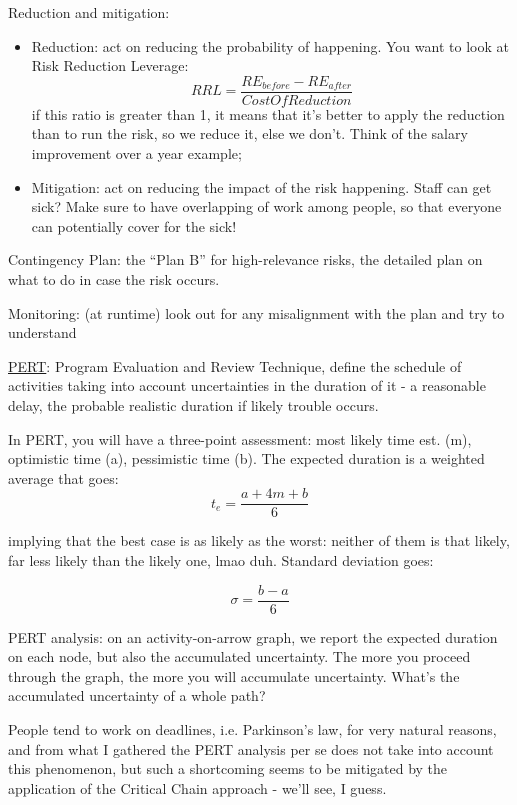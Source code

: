 \noindent Reduction and mitigation:
\begin{itemize}
    \item Reduction: act on reducing the probability of happening. You want to look at Risk Reduction Leverage: \[RRL = \dfrac{RE_{before}-RE_{after}}{CostOfReduction}\]
    if this ratio is greater than 1, it means that it's better to apply the reduction than to run the risk, so we reduce it, else we don't. Think of the salary improvement over a year example;
    \item Mitigation: act on reducing the impact of the risk happening. Staff can get sick? Make sure to have overlapping of work among people, so that everyone can potentially cover for the sick! 
\end{itemize}

\noindent Contingency Plan: the ``Plan B'' for high-relevance risks, the detailed plan on what to do in case the risk occurs.

\noindent Monitoring: (at runtime) look out for any misalignment with the plan and try to understand

\noindent \underline{PERT}: Program Evaluation and Review Technique, define the schedule of activities taking into account uncertainties in the duration of it - a reasonable delay, the probable realistic duration if likely trouble occurs.

\noindent In PERT, you will have a three-point assessment: most likely time est. (m), optimistic time (a), pessimistic time (b). The expected duration is a weighted average that goes:
\[t_e = \dfrac{a+4m+b}{6}\]

\noindent implying that the best case is as likely as the worst: neither of them is that likely, far less likely than the likely one, lmao duh. Standard deviation goes:

\[\sigma = \dfrac{b-a}{6}\]

\noindent PERT analysis: on an activity-on-arrow graph, we report the expected duration on each node, but also the accumulated uncertainty. The more you proceed through the graph, the more you will accumulate uncertainty. What's the accumulated uncertainty of a whole path?

\noindent People tend to work on deadlines, i.e. Parkinson's law, for very natural reasons, and from what I gathered the PERT analysis per se does not take into account this phenomenon, but such a shortcoming seems to be mitigated by the application of the Critical Chain approach - we'll see, I guess.

